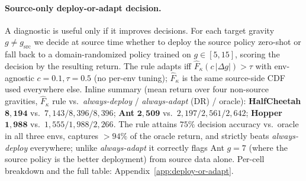 \paragraph{Source-only deploy-or-adapt decision.} A diagnostic is useful only if it improves decisions. For each target gravity $g \neq g_\mathrm{src}$ we decide at source time whether to deploy the source policy zero-shot or fall back to a domain-randomized policy trained on $g\in[5,15]$, scoring the decision by the resulting return. The rule adapts iff $\hat F_\kappa(c\,|\Delta g|) > \tau$ with env-agnostic $c=0.1, \tau=0.5$ (no per-env tuning); $\hat F_\kappa$ is the same source-side CDF used everywhere else. Inline summary (mean return over four non-source gravities, $\hat F_\kappa$ rule vs.\ \emph{always-deploy} / \emph{always-adapt} (DR) / oracle): \textbf{HalfCheetah} $\mathbf{8{,}194}$ vs.\ $7{,}143/8{,}396/8{,}396$; \textbf{Ant} $\mathbf{2{,}509}$ vs.\ $2{,}197/2{,}561/2{,}642$; \textbf{Hopper} $\mathbf{1{,}988}$ vs.\ $1{,}555/1{,}988/2{,}266$. The rule attains $75\%$ decision accuracy vs.\ oracle in all three envs, captures ${>}94\%$ of the oracle return, and strictly beats \emph{always-deploy} everywhere; unlike \emph{always-adapt} it correctly flags Ant $g{=}7$ (where the source policy is the better deployment) from source data alone. Per-cell breakdown and the full table: Appendix~\ref{app:deploy-or-adapt}.
